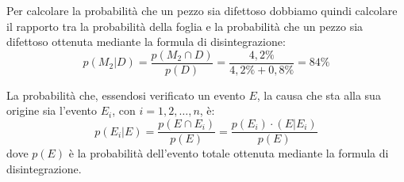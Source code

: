 \documentclass{article}     %
\begin{document}
\begin{ex}
                                                Per calcolare la probabilità che un pezzo sia difettoso dobbiamo quindi calcolare il rapporto tra la probabilità della foglia e la probabilità che un pezzo sia difettoso ottenuta mediante la formula di disintegrazione:
                                                \[p(M_2|D)=\frac{p(M_2\cap D)}{p(D)}=\frac{4,2\%}{4,2\%+0,8\%}=84\%\]
                                            \end{ex}
                    \begin{shadedTheorem}
                        La probabilità che, essendosi verificato un evento $E$, la causa che sta alla sua origine sia l'evento $E_i$, con $i=1,2,\dots, n$, è:
                        \[p(E_i|E)=\frac{p(E\cap E_i)}{p(E)}=\frac{p(E_i)\cdotp(E|E_i)}{p(E)}\]
                        dove $p(E)$ è la probabilità dell'evento totale ottenuta mediante la formula di disintegrazione. 
                    \end{shadedTheorem}
\end{document}
